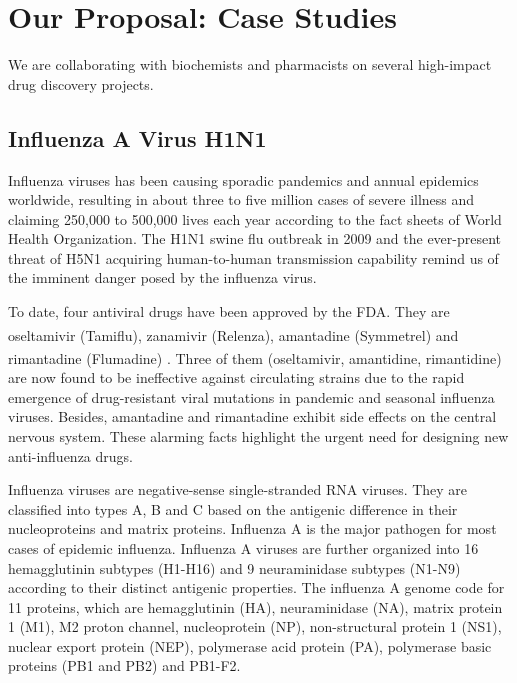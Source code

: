 \chapter{Our Proposal: Case Studies}

We are collaborating with biochemists and pharmacists on several high-impact drug discovery projects.

\section{Influenza A Virus H1N1}

Influenza viruses has been causing sporadic pandemics and annual epidemics worldwide, resulting in about three to five million cases of severe illness and claiming 250,000 to 500,000 lives each year according to the fact sheets of World Health Organization. The H1N1 swine flu outbreak in 2009 and the ever-present threat of H5N1 acquiring human-to-human transmission capability remind us of the imminent danger posed by the influenza virus.

To date, four antiviral drugs have been approved by the FDA. They are oseltamivir (Tamiflu\textsuperscript{\textregistered}), zanamivir (Relenza\textsuperscript{\textregistered}), amantadine (Symmetrel\textsuperscript{\textregistered}) and rimantadine (Flumadine\textsuperscript{\textregistered}) \citep{1229}. Three of them (oseltamivir, amantidine, rimantidine) are now found to be ineffective against circulating strains due to the rapid emergence of drug-resistant viral mutations in pandemic and seasonal influenza viruses. Besides, amantadine and rimantadine exhibit side effects on the central nervous system. These alarming facts highlight the urgent need for designing new anti-influenza drugs.

Influenza viruses are negative-sense single-stranded RNA viruses. They are classified into types A, B and C based on the antigenic difference in their nucleoproteins and matrix proteins. Influenza A is the major pathogen for most cases of epidemic influenza. Influenza A viruses are further organized into 16 hemagglutinin subtypes (H1-H16) and 9 neuraminidase subtypes (N1-N9) according to their distinct antigenic properties. The influenza A genome code for 11 proteins, which are hemagglutinin (HA), neuraminidase (NA), matrix protein 1 (M1), M2 proton channel, nucleoprotein (NP), non-structural protein 1 (NS1), nuclear export protein (NEP), polymerase acid protein (PA), polymerase basic proteins (PB1 and PB2) and PB1-F2.

